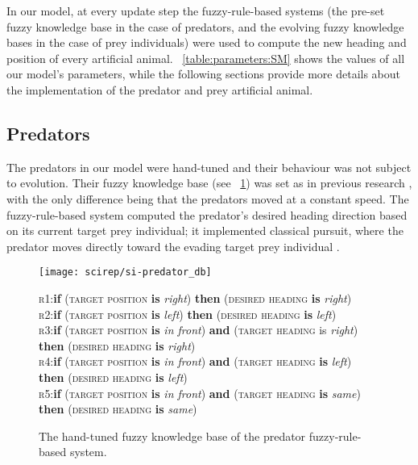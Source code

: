 In our model, at every update step the fuzzy-rule-based systems (\ie the pre-set fuzzy knowledge base in the case of predators, and the evolving fuzzy knowledge bases in the case of prey individuals) were used to compute the new heading and position of every artificial animal. \tablename~\ref{table:parameters:SM} shows the values of all our model's parameters, while the following sections provide more details about the implementation of the predator and prey artificial animal.

\subsection{Predators}
The predators in our model were hand-tuned and their behaviour was not subject to evolution. Their fuzzy knowledge base (see \figurename~\ref{figure:predator}) was set as in previous research \cite{demsar2014simulated}, with the only difference being that the predators moved at a constant speed. The fuzzy-rule-based system computed the predator's desired heading direction based on its current target prey individual; it implemented classical pursuit, where the predator moves directly toward the evading target prey individual \cite{kane2014falcons,nahin2012chases}.

\begin{figure}
  \texttt{[image: scirep/si-predator\_db]}\\
  \scriptsize
  \vspace*{3mm}
	\begin{minipage}{\figurewidth}
		\textsc{r}1:\quad \textbf{if} (\textsc{target position} \textbf{is} \emph{right}) \textbf{then} (\textsc{desired heading} \textbf{is} \emph{right})\\
		\textsc{r}2:\quad \textbf{if} (\textsc{target position} \textbf{is} \emph{left}) \textbf{then} (\textsc{desired heading} \textbf{is} \emph{left}) \\
		\textsc{r}3:\quad \textbf{if} (\textsc{target position} \textbf{is} \emph{in front}) \textbf{and} (\textsc{target heading} is \emph{right}) \textbf{then} (\textsc{desired heading} \textbf{is} \emph{right})\\
		\textsc{r}4:\quad \textbf{if} (\textsc{target position} \textbf{is} \emph{in front}) \textbf{and} (\textsc{target heading} \textbf{is} \emph{left}) \textbf{then} (\textsc{desired heading} \textbf{is} \emph{left})\\
		\textsc{r}5:\quad \textbf{if} (\textsc{target position} \textbf{is} \emph{in front}) \textbf{and} (\textsc{target heading} \textbf{is} \emph{same}) \textbf{then} (\textsc{desired heading} \textbf{is} \emph{same})
	\end{minipage}
  \caption{The hand-tuned fuzzy knowledge base of the predator fuzzy-rule-based system.}
  \label{figure:predator}
\end{figure}

